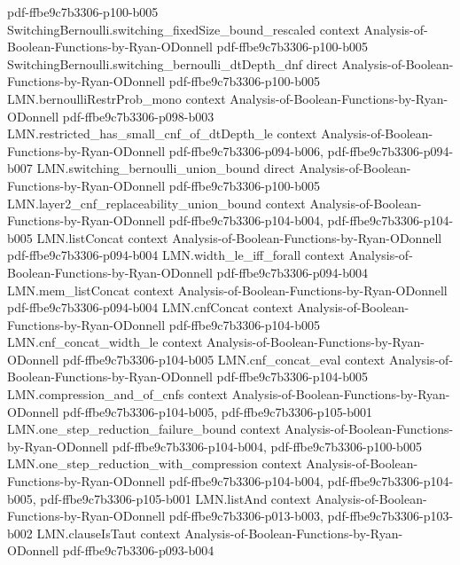 \begin{theorem}
  {pdf-ffbe9c7b3306-p100-b005}
\proofstep
  {SwitchingBernoulli.switching_fixedSize_bound_rescaled}
  {context}
  {Analysis-of-Boolean-Functions-by-Ryan-ODonnell}
  {pdf-ffbe9c7b3306-p100-b005}
\proofstep
  {SwitchingBernoulli.switching_bernoulli_dtDepth_dnf}
  {direct}
  {Analysis-of-Boolean-Functions-by-Ryan-ODonnell}
  {pdf-ffbe9c7b3306-p100-b005}
\proofstep
  {LMN.bernoulliRestrProb_mono}
  {context}
  {Analysis-of-Boolean-Functions-by-Ryan-ODonnell}
  {pdf-ffbe9c7b3306-p098-b003}
\proofstep
  {LMN.restricted_has_small_cnf_of_dtDepth_le}
  {context}
  {Analysis-of-Boolean-Functions-by-Ryan-ODonnell}
  {pdf-ffbe9c7b3306-p094-b006,
    pdf-ffbe9c7b3306-p094-b007}
\proofstep
  {LMN.switching_bernoulli_union_bound}
  {direct}
  {Analysis-of-Boolean-Functions-by-Ryan-ODonnell}
  {pdf-ffbe9c7b3306-p100-b005}
\proofstep
  {LMN.layer2_cnf_replaceability_union_bound}
  {context}
  {Analysis-of-Boolean-Functions-by-Ryan-ODonnell}
  {pdf-ffbe9c7b3306-p104-b004,
    pdf-ffbe9c7b3306-p104-b005}
\proofstep
  {LMN.listConcat}
  {context}
  {Analysis-of-Boolean-Functions-by-Ryan-ODonnell}
  {pdf-ffbe9c7b3306-p094-b004}
\proofstep
  {LMN.width_le_iff_forall}
  {context}
  {Analysis-of-Boolean-Functions-by-Ryan-ODonnell}
  {pdf-ffbe9c7b3306-p094-b004}
\proofstep
  {LMN.mem_listConcat}
  {context}
  {Analysis-of-Boolean-Functions-by-Ryan-ODonnell}
  {pdf-ffbe9c7b3306-p094-b004}
\proofstep
  {LMN.cnfConcat}
  {context}
  {Analysis-of-Boolean-Functions-by-Ryan-ODonnell}
  {pdf-ffbe9c7b3306-p104-b005}
\proofstep
  {LMN.cnf_concat_width_le}
  {context}
  {Analysis-of-Boolean-Functions-by-Ryan-ODonnell}
  {pdf-ffbe9c7b3306-p104-b005}
\proofstep
  {LMN.cnf_concat_eval}
  {context}
  {Analysis-of-Boolean-Functions-by-Ryan-ODonnell}
  {pdf-ffbe9c7b3306-p104-b005}
\proofstep
  {LMN.compression_and_of_cnfs}
  {context}
  {Analysis-of-Boolean-Functions-by-Ryan-ODonnell}
  {pdf-ffbe9c7b3306-p104-b005,
    pdf-ffbe9c7b3306-p105-b001}
\proofstep
  {LMN.one_step_reduction_failure_bound}
  {context}
  {Analysis-of-Boolean-Functions-by-Ryan-ODonnell}
  {pdf-ffbe9c7b3306-p104-b004,
    pdf-ffbe9c7b3306-p100-b005}
\proofstep
  {LMN.one_step_reduction_with_compression}
  {context}
  {Analysis-of-Boolean-Functions-by-Ryan-ODonnell}
  {pdf-ffbe9c7b3306-p104-b004,
    pdf-ffbe9c7b3306-p104-b005,
    pdf-ffbe9c7b3306-p105-b001}
\proofstep
  {LMN.listAnd}
  {context}
  {Analysis-of-Boolean-Functions-by-Ryan-ODonnell}
  {pdf-ffbe9c7b3306-p013-b003,
    pdf-ffbe9c7b3306-p103-b002}
\proofstep
  {LMN.clauseIsTaut}
  {context}
  {Analysis-of-Boolean-Functions-by-Ryan-ODonnell}
  {pdf-ffbe9c7b3306-p093-b004}

\end{theorem}
